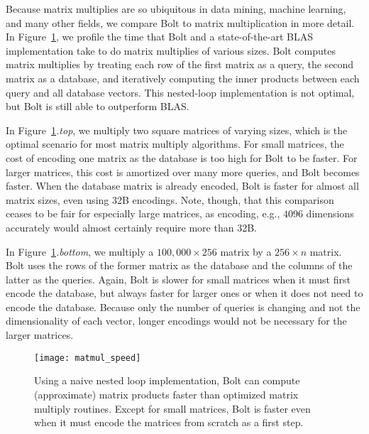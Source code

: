 Because matrix multiplies are so ubiquitous in data mining, machine learning, and many other fields, we compare Bolt to matrix multiplication in more detail. In Figure~\ref{fig:matmul_speed}, we profile the time that Bolt and a state-of-the-art BLAS implementation \cite{eigen} take to do matrix multiplies of various sizes. Bolt computes matrix multiplies by treating each row of the first matrix as a query, the second matrix as a database, and iteratively computing the inner products between each query and all database vectors. This nested-loop implementation is not optimal, but Bolt is still able to outperform BLAS.

In Figure~\ref{fig:matmul_speed}\textit{.top}, we multiply two square matrices of varying sizes, which is the optimal scenario for most matrix multiply algorithms. For small matrices, the cost of encoding one matrix as the database is too high for Bolt to be faster. For larger matrices, this cost is amortized over many more queries, and Bolt becomes faster. When the database matrix is already encoded, Bolt is faster for almost all matrix sizes, even using 32B encodings. Note, though, that this comparison ceases to be fair for especially large matrices, as encoding, e.g., $4096$ dimensions accurately would almost certainly require more than 32B. %

In Figure~\ref{fig:matmul_speed}\textit{.bottom}, we multiply a $100,000 \times 256$ matrix by a $256 \times n$ matrix. Bolt uses the rows of the former matrix as the database and the columns of the latter as the queries. Again, Bolt is slower for small matrices when it must first encode the database, but always faster for larger ones or when it does not need to encode the database. Because only the number of queries is changing and not the dimensionality of each vector, longer encodings would not be necessary for the larger matrices.


\begin{figure}[h]
\begin{center}
\texttt{[image: matmul\_speed]}
\caption{Using a naive nested loop implementation, Bolt can compute (approximate) matrix products faster than optimized matrix multiply routines. Except for small matrices, Bolt is faster even when it must encode the matrices from scratch as a first step.}
\label{fig:matmul_speed}
\end{center}
\end{figure}

